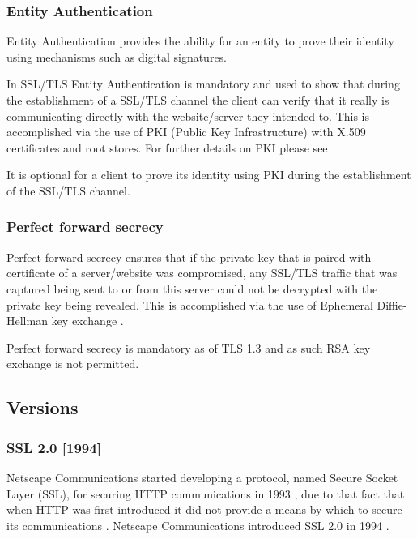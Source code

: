 \documentclass{mscreport}
\begin{document}
\subsubsection{Entity Authentication}

Entity Authentication provides the ability for an entity to prove their identity using mechanisms such as digital signatures.

\vspace{0.3cm} \noindent
In SSL/TLS Entity Authentication is mandatory and used to show that during the establishment of a SSL/TLS channel the client can verify that it really is communicating directly with the website/server they intended to. This is accomplished via the use of PKI (Public Key Infrastructure) with X.509 certificates and root stores. For further details on PKI please see \cite{Clark2013-sh,Holz2011-yv}

\vspace{0.3cm} \noindent
It is optional for a client to prove its identity using PKI during the establishment of the SSL/TLS channel.

\subsubsection{Perfect forward secrecy}

Perfect forward secrecy ensures that if the private key that is paired with certificate of a server/website was compromised, any SSL/TLS traffic that was captured being sent to or from this server could not be decrypted with the private key being revealed. This is accomplished via the use of Ephemeral Diffie-Hellman key exchange \cite{Martin2017-sx}.

\vspace{0.3cm} \noindent
Perfect forward secrecy is mandatory as of TLS 1.3 and as such RSA key exchange is not permitted.

\subsection{Versions}

\subsubsection{SSL 2.0 [1994]}

Netscape Communications started developing a protocol, named Secure Socket Layer (SSL), for securing HTTP communications in 1993 \cite{Oppliger2016-ig}, due to that fact that when HTTP was first introduced it did not provide a means by which to secure its communications \cite{Oppliger2016-ig}.
Netscape Communications introduced SSL 2.0 in 1994 \cite{Oppliger2016-ig,Wu2016-nx}.
\end{document}
